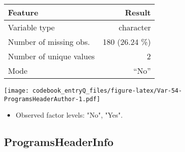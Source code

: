 \documentclass[]{article}
\providecommand{\tightlist}{%
  \setlength{\itemsep}{0pt}\setlength{\parskip}{0pt}}
\newcommand{\fullline}{\noindent\makebox[\linewidth]{\rule{\textwidth}{0.4pt}}}
\newcommand{\bminione}{\begin{minipage}{0.75 \textwidth}}
\newcommand{\bminitwo}{\begin{minipage}{0.25 \textwidth}}
\newcommand{\emini}{\end{minipage}}
\begin{document}
\bminione

\begin{longtable}[]{@{}lr@{}}
\toprule
\begin{minipage}[b]{0.34\columnwidth}\raggedright\strut
Feature\strut
\end{minipage} & \begin{minipage}[b]{0.20\columnwidth}\raggedleft\strut
Result\strut
\end{minipage}\tabularnewline
\midrule
\endhead
\begin{minipage}[t]{0.34\columnwidth}\raggedright\strut
Variable type\strut
\end{minipage} & \begin{minipage}[t]{0.20\columnwidth}\raggedleft\strut
character\strut
\end{minipage}\tabularnewline
\begin{minipage}[t]{0.34\columnwidth}\raggedright\strut
Number of missing obs.\strut
\end{minipage} & \begin{minipage}[t]{0.20\columnwidth}\raggedleft\strut
180 (26.24 \%)\strut
\end{minipage}\tabularnewline
\begin{minipage}[t]{0.34\columnwidth}\raggedright\strut
Number of unique values\strut
\end{minipage} & \begin{minipage}[t]{0.20\columnwidth}\raggedleft\strut
2\strut
\end{minipage}\tabularnewline
\begin{minipage}[t]{0.34\columnwidth}\raggedright\strut
Mode\strut
\end{minipage} & \begin{minipage}[t]{0.20\columnwidth}\raggedleft\strut
``No''\strut
\end{minipage}\tabularnewline
\bottomrule
\end{longtable}

\emini
\bminitwo
\texttt{[image: codebook\_entryQ\_files/figure-latex/Var-54-ProgramsHeaderAuthor-1.pdf]}
\emini

\begin{itemize}
\tightlist
\item
  Observed factor levels: "No", "Yes".
\end{itemize}

\fullline

\hypertarget{programsheaderinfo}{\subsection{ProgramsHeaderInfo}\label{programsheaderinfo}}
\end{document}
